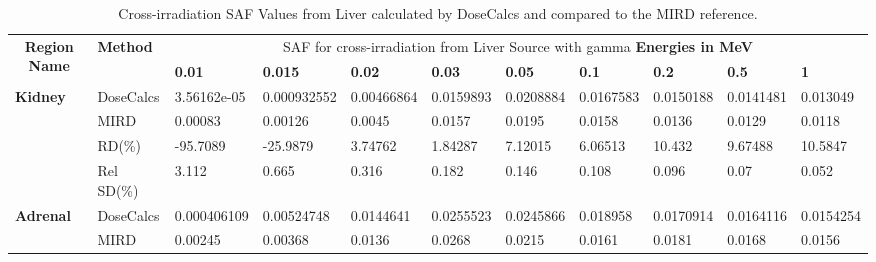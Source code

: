 \documentclass[letterpaper,12pt]{article}
\begin{document}
\begin{table}[H] 
\centering
\caption{Cross-irradiation SAF Values from Liver calculated by DoseCalcs and compared to the MIRD reference. } 
\begin{adjustbox}{width=\columnwidth,center}
\begin{threeparttable}
\begin{tabular}{lllllllllll} \hline 
\multicolumn{1}{c}{\multirow{2}{*}{\textbf{Region Name}}} & \multirow{2}{*}{\textbf{Method}} & \multicolumn{9}{c}{ SAF for cross-irradiation from Liver Source with gamma \textbf{Energies in MeV}}       \\ \cline{3-11}
                 \multicolumn{1}{c}{}                             & \multicolumn{1}{c}{}                           & \textbf{0.01}   & \textbf{0.015}   & \textbf{0.02}   & \textbf{0.03}   & \textbf{0.05}   & \textbf{0.1}   & \textbf{0.2}   & \textbf{0.5}   & \textbf{1}       \\\hline 
\multirow{4}{*}{\textbf{Kidney}}       & DoseCalcs                                         & 3.56162e-05        & 0.000932552        & 0.00466864        & 0.0159893        & 0.0208884        & 0.0167583        & 0.0150188        & 0.0141481        & 0.013049        \\ 
                             & MIRD                                        & 0.00083        & 0.00126        & 0.0045        & 0.0157        & 0.0195        & 0.0158        & 0.0136        & 0.0129        & 0.0118        \\ 
                             & RD(\%)\tnote{a}                                         & -95.7089        & -25.9879     & 3.74762        & 1.84287        & 7.12015        & 6.06513        & 10.432        & 9.67488        & 10.5847        \\ 
                             & Rel SD(\%)\tnote{b}                                          & 3.112        & 0.665        & 0.316        & 0.182        & 0.146        & 0.108        & 0.096        & 0.07        & 0.052               \\\hline 
\multirow{4}{*}{\textbf{Adrenal}}       & DoseCalcs                                         & 0.000406109        & 0.00524748        & 0.0144641        & 0.0255523        & 0.0245866        & 0.018958        & 0.0170914        & 0.0164116        & 0.0154254        \\ 
                             & MIRD                                        & 0.00245        & 0.00368        & 0.0136        & 0.0268        & 0.0215        & 0.0161        & 0.0181        & 0.0168        & 0.0156        \\ 

\end{tabular}
\end{threeparttable}
\end{adjustbox}
\end{table}
\end{document}

